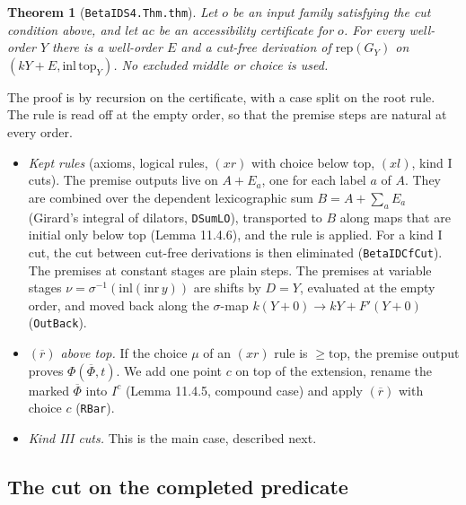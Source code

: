 \documentclass[11pt]{article}
\newtheorem{theorem}{Theorem}[section]
\theoremstyle{remark}
\newcommand{\Phib}{\overline{\Phi}}
\newcommand{\rep}{\mathrm{rep}}
\renewcommand{\tt}[1]{\texttt{#1}}
\begin{document}
\begin{theorem}[\texttt{BetaIDS4.Thm.thm}]\label{thm:pointwise}
Let $o$ be an input family satisfying the cut condition above, and let
$ac$ be an accessibility certificate for $o$. For every well-order $Y$
there is a well-order $E$ and a cut-free derivation of $\rep(G_Y)$ on
$(kY+E,\mathrm{inl}\,\mathrm{top}_Y)$. No excluded middle or choice is used.
\end{theorem}

The proof is by recursion on the certificate, with a case split on the
root rule. The rule is read off at the empty order, so that the premise
steps are natural at every order.
\begin{itemize}
\item \emph{Kept rules} (axioms, logical rules, $(xr)$ with choice below
top, $(xl)$, kind I cuts). The premise outputs live on $A+E_a$, one for
each label $a$ of $A$. They are combined over the dependent
lexicographic sum $B=A+\sum_{a}E_a$ (Girard's integral of dilators,
\tt{DSumLO}), transported to $B$ along maps that are initial only below
top (Lemma 11.4.6), and the rule is applied. For a kind I cut, the cut
between cut-free derivations is then eliminated (\texttt{BetaIDCfCut}). The
premises at constant stages are plain steps. The premises at variable
stages $\nu=\sigma^{-1}(\mathrm{inl}(\mathrm{inr}\,y))$ are shifts by
$D=Y$, evaluated at the empty order, and moved back along the
$\sigma$-map $k(Y+0)\to kY+F'(Y+0)$ (\tt{OutBack}).
\item \emph{$(\overline{r})$ above top.} If the choice $\mu$ of an
$(xr)$ rule is $\ge\mathrm{top}$, the premise output proves $\Phi(\Phib,t)$. We add
one point $c$ on top of the extension, rename the marked $\Phib$ into
$I^c$ (Lemma 11.4.5, compound case) and apply $(\overline r)$ with
choice $c$ (\tt{RBar}).
\item \emph{Kind III cuts.} This is the main case, described next.
\end{itemize}

\subsection{The cut on the completed predicate}
\end{document}
